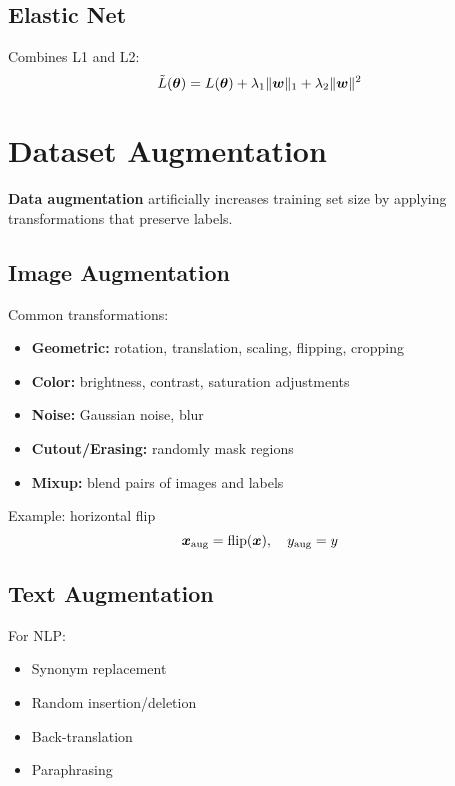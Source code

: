 \subsection{Elastic Net}

Combines L1 and L2:
\begin{equation}
\tilde{L}(\boldsymbol{\theta}) = L(\boldsymbol{\theta}) + \lambda_1 \|\boldsymbol{w}\|_1 + \lambda_2 \|\boldsymbol{w}\|^2
\end{equation}

\section{Dataset Augmentation}
\label{sec:data-augmentation}

\textbf{Data augmentation} artificially increases training set size by applying transformations that preserve labels.

\subsection{Image Augmentation}

Common transformations:
\begin{itemize}
    \item \textbf{Geometric:} rotation, translation, scaling, flipping, cropping
    \item \textbf{Color:} brightness, contrast, saturation adjustments
    \item \textbf{Noise:} Gaussian noise, blur
    \item \textbf{Cutout/Erasing:} randomly mask regions
    \item \textbf{Mixup:} blend pairs of images and labels
\end{itemize}

Example: horizontal flip
\begin{equation}
\boldsymbol{x}_{\text{aug}} = \text{flip}(\boldsymbol{x}), \quad y_{\text{aug}} = y
\end{equation}

\subsection{Text Augmentation}

For NLP:
\begin{itemize}
    \item Synonym replacement
    \item Random insertion/deletion
    \item Back-translation
    \item Paraphrasing
\end{itemize}

